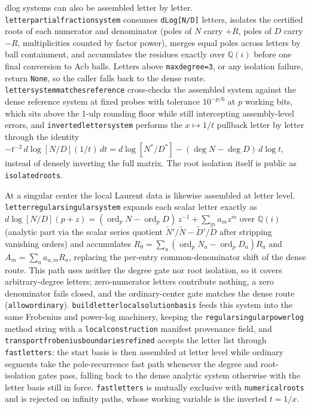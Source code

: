 \documentclass[11pt]{article}
\renewcommand{\_}{\origunderscore\allowbreak}
\begin{document}
\normalsize

dlog systems can also be assembled letter by letter.  \texttt{letter\_partial\_fraction\_system}
consumes \texttt{dLog[N/D]} letters, isolates the certified roots of each numerator and
denominator (poles of $N$ carry $+R$, poles of $D$ carry $-R$, multiplicities counted by
factor power), merges equal poles across letters by ball containment, and accumulates the
residues exactly over $\mathbb Q(i)$ before one final conversion to Acb balls.  Letters above
\texttt{max\_degree=3}, or any isolation failure, return \texttt{None}, so the caller falls
back to the dense route.  \texttt{letter\_system\_matches\_reference} cross-checks the
assembled system against the dense reference system at fixed probes with tolerance
$10^{-p/6}$ at $p$ working bits, which sits above the 1-ulp rounding floor while still
intercepting assembly-level errors, and \texttt{inverted\_letter\_system} performs the
$x\mapsto1/t$ pullback letter by letter through the identity
$-t^{-2}\,d\log[N/D](1/t)\,dt=d\log[N^{*}/D^{*}]-(\deg N-\deg D)\,d\log t$, instead of densely
inverting the full matrix.  The root isolation itself is public as \texttt{isolated\_roots}.

At a singular center the local Laurent data is likewise assembled at letter level.
\texttt{letter\_regular\_singular\_system} expands each scalar letter exactly as
$d\log[N/D](p+z)=(\operatorname{ord}_pN-\operatorname{ord}_pD)\,z^{-1}+\sum_ma_mz^m$
over $\mathbb Q(i)$ (analytic part via the scalar series quotient
$\tilde N'/\tilde N-\tilde D'/\tilde D$ after stripping vanishing orders) and accumulates
$R_0=\sum_a(\operatorname{ord}_pN_a-\operatorname{ord}_pD_a)R_a$ and
$A_m=\sum_a a_{a,m}R_a$, replacing the per-entry common-denominator shift of the dense
route.  This path uses neither the degree gate nor root isolation, so it covers
arbitrary-degree letters; zero-numerator letters contribute nothing, a zero denominator
fails closed, and the ordinary-center gate matches the dense route
(\texttt{allow\_ordinary}).  \texttt{build\_letter\_local\_solution\_basis} feeds this
system into the same Frobenius and power-log machinery, keeping the
\texttt{regular\_singular\_power\_log} method string with a \texttt{local\_construction}
manifest provenance field, and \texttt{transport\_frobenius\_boundaries\_refined} accepts
the letter list through \texttt{fast\_letters}: the start basis is then assembled at
letter level while ordinary segments take the pole-recurrence fast path whenever the
degree and root-isolation gates pass, falling back to the dense analytic system otherwise
with the letter basis still in force.  \texttt{fast\_letters} is mutually exclusive with
\texttt{numerical\_roots} and is rejected on infinity paths, whose working variable is the
inverted $t=1/x$.
\end{document}
